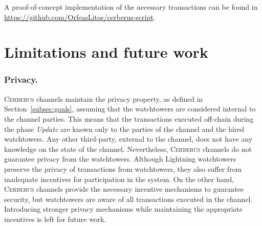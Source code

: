 \documentclass[runningheads]{llncs}
\newcommand{\sys}{\textsc{Cerberus}\xspace}
\begin{document}
A proof-of-concept implementation of the necessary transactions can be found in
\url{https://github.com/OrfeasLitos/cerberus-script}.
\fi

\section{Limitations and future work}\label{sec:limit}

\vspace{-3pt}
\subsubsection*{Privacy.}
\sys channels maintain the privacy property, as defined in Section~\ref{subsec:goals}, assuming that the watchtowers are considered internal to the channel parties. This means that the transactions executed off-chain during the phase \textit{Update} are known only to the parties of the channel and the hired watchtowers. Any other third-party, external to the channel, does not have any knowledge on the state of the channel.
Nevertheless, \sys channels do not guarantee privacy from the watchtowers.
Although Lightning watchtowers preserve the privacy of transactions from watchtowers, they also suffer from inadequate incentives for participation in the system. On the other hand, \sys channels provide the necessary incentive mechanisms to guarantee security, but watchtowers are aware of all transactions executed in the channel.
Introducing stronger privacy mechanisms while maintaining the appropriate incentives is left for future work.

\vspace{-3pt}
\end{document}
